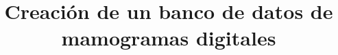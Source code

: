 \documentclass[11pt, a4paper, oneside]{memoir}
\begin{document}
\title{Creación de un banco de datos de mamogramas digitales}
\maketitle
\tableofcontents
\end{document}
